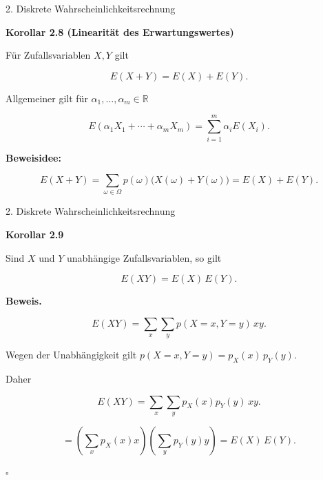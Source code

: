 \documentclass{beamer}
\begin{document}
\begin{frame}{2. Diskrete Wahrscheinlichkeitsrechnung}

\textbf{Korollar 2.8 (Linearität des Erwartungswertes)}

\vspace{0.3cm}

Für Zufallsvariablen \(X,Y\) gilt

\[
E(X+Y)
=
E(X)+E(Y).
\]

\vspace{0.4cm}

Allgemeiner gilt für
\(\alpha_1,\ldots,\alpha_m\in\mathbb R\)

\[
E(\alpha_1X_1+\cdots+\alpha_mX_m)
=
\sum_{i=1}^{m}\alpha_iE(X_i).
\]

\vspace{0.4cm}

\textbf{Beweisidee:}

\[
E(X+Y)
=
\sum_{\omega\in\Omega}
p(\omega)\bigl(X(\omega)+Y(\omega)\bigr)
=
E(X)+E(Y).
\]

\end{frame}

\begin{frame}{2. Diskrete Wahrscheinlichkeitsrechnung}

\textbf{Korollar 2.9}

\vspace{0.2cm}

Sind \(X\) und \(Y\) unabhängige Zufallsvariablen, so gilt

\[
E(XY)=E(X)\,E(Y).
\]

\vspace{0.3cm}

\textbf{Beweis.}

\[
E(XY)
=
\sum_{x}\sum_{y}
p(X=x,Y=y)\,xy.
\]

Wegen der Unabhängigkeit gilt \(p(X=x,Y=y)=p_X(x)\,p_Y(y).\)

Daher

\[
E(XY)
=
\sum_{x}\sum_{y}
p_X(x)p_Y(y)\,xy.
\]

\[
=
\left(\sum_x p_X(x)x\right)
\left(\sum_y p_Y(y)y\right)
=
E(X)\,E(Y).
\]

\hfill\(\square\)

\end{frame}
\end{document}
